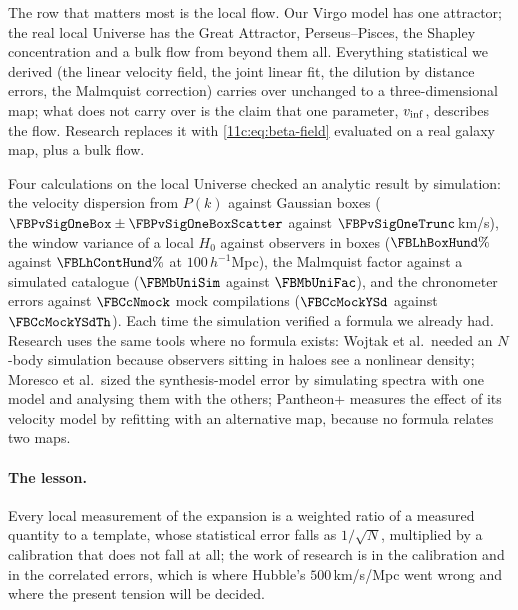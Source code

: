 The row that matters most is the local flow. Our Virgo model has one attractor; the real
local Universe has the Great Attractor, Perseus--Pisces, the Shapley concentration and
a bulk flow from beyond them all. Everything statistical we derived (the linear
velocity field, the joint linear fit, the dilution by distance errors, the Malmquist
correction) carries over unchanged to a three-dimensional map; what does not carry over
is the claim that one parameter, $v_{\rm inf}$, describes the flow. Research replaces it
with \eqref{11c:eq:beta-field} evaluated on a real galaxy map, plus a bulk flow.

\begin{inpractice}
Four calculations on the local Universe checked an analytic result by simulation: the
velocity dispersion from $P(k)$ against Gaussian boxes ($\FBPvSigOneBox\pm\FBPvSigOneBoxScatter$
against $\FBPvSigOneTrunc$\,km/s), the window variance of a local $H_0$ against observers in
boxes ($\FBLhBoxHund\%$ against $\FBLhContHund\%$ at $100\,h^{-1}$Mpc), the Malmquist factor
against a simulated catalogue ($\FBMbUniSim$ against $\FBMbUniFac$), and the chronometer
errors against $\FBCcNmock$ mock compilations ($\FBCcMockYSd$ against $\FBCcMockYSdTh$). Each
time the simulation verified a formula we already had. Research uses the same tools
where no formula exists: Wojtak et al.\ needed an $N$-body simulation because
observers sitting in haloes see a nonlinear density; Moresco et al.\ sized the
synthesis-model error by simulating spectra with one model and analysing them with
the others; Pantheon+ measures the effect of its velocity model by refitting with an
alternative map, because no formula relates two maps.
\end{inpractice}

\paragraph{The lesson.} Every local measurement of the expansion is a weighted ratio of a
measured quantity to a template, whose statistical error falls as $1/\sqrt N$, multiplied
by a calibration that does not fall at all; the work of research is in the calibration
and in the correlated errors, which is where Hubble's $500$\,km/s/Mpc went wrong
and where the present tension will be decided.

